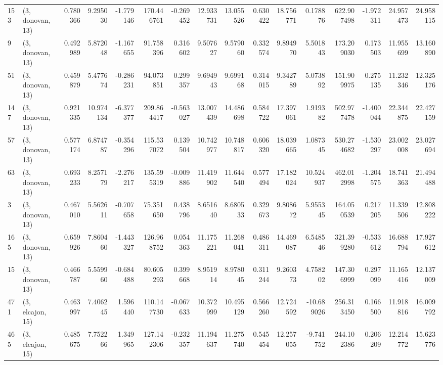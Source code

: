 \begin{tabular}{llrrrrrrrrrrrrrr}
153 &  (3, donovan, 13) &   0.780366 &   9.295030 &  -1.779146 &   170.446761 &  -0.269452 &  12.933731 &  13.055526 &  0.630422 &  18.756771 &   0.178876 &   622.907498 & -1.972311 &  24.957473 &  24.958115 \\
9   &  (3, donovan, 13) &   0.492989 &   5.872048 &  -1.167655 &    91.758396 &   0.316602 &   9.507627 &   9.579060 &  0.332574 &   9.894970 &   5.501843 &   173.209030 &  0.173503 &  11.955699 &  13.160890 \\
51  &  (3, donovan, 13) &   0.459879 &   5.477674 &  -0.286231 &    94.073851 &   0.299357 &   9.694943 &   9.699168 &  0.314015 &   9.342789 &   5.073892 &   151.909975 &  0.275135 &  11.232346 &  12.325176 \\
147 &  (3, donovan, 13) &   0.921335 &  10.974134 &  -6.377377 &   209.864417 &  -0.563027 &  13.007439 &  14.486698 &  0.584722 &  17.397061 &   1.919382 &   502.977478 & -1.400044 &  22.344875 &  22.427159 \\
57  &  (3, donovan, 13) &   0.577174 &   6.874787 &  -0.354296 &   115.537072 &   0.139504 &  10.742977 &  10.748817 &  0.606320 &  18.039665 &   1.087345 &   530.274682 & -1.530297 &  23.002008 &  23.027694 \\
63  &  (3, donovan, 13) &   0.693233 &   8.257179 &  -2.276217 &   135.595319 &  -0.009886 &  11.419902 &  11.644540 &  0.577494 &  17.182024 &  10.524937 &   462.012998 & -1.204575 &  18.741363 &  21.494488 \\
3   &  (3, donovan, 13) &   0.467010 &   5.562611 &  -0.707658 &    75.351650 &   0.438796 &   8.651640 &   8.680533 &  0.329673 &   9.808672 &   5.955345 &   164.050539 &  0.217205 &  11.339506 &  12.808222 \\
165 &  (3, donovan, 13) &   0.659926 &   7.860460 &  -1.443327 &   126.968752 &   0.054363 &  11.175221 &  11.268041 &  0.486311 &  14.469087 &   6.548546 &   321.399280 & -0.533612 &  16.688794 &  17.927612 \\
15  &  (3, donovan, 13) &   0.466787 &   5.559960 &  -0.684488 &    80.605293 &   0.399668 &   8.951914 &   8.978045 &  0.311244 &   9.260373 &   4.758202 &   147.306999 &  0.297099 &  11.165416 &  12.137009 \\
471 &  (3, elcajon, 15) &   0.463997 &   7.406245 &   1.596440 &   110.147730 &  -0.067633 &  10.372999 &  10.495129 &  0.566260 &  12.724592 & -10.689026 &   256.313450 &  0.166500 &  11.918816 &  16.009792 \\
465 &  (3, elcajon, 15) &   0.485675 &   7.752266 &   1.349965 &   127.142306 &  -0.232357 &  11.194637 &  11.275740 &  0.545454 &  12.257055 &  -9.741752 &   244.102386 &  0.206209 &  12.214772 &  15.623776 \\

\end{tabular}
